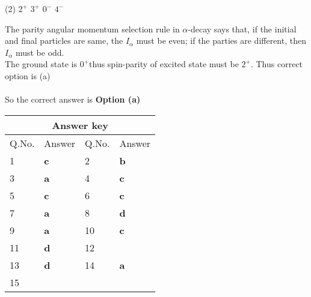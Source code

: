 \begin{enumerate}
	\begin{tasks}(2)
		\task[\textbf{a.}]$2^{+}$
		\task[\textbf{b.}]$3^{+}$
		\task[\textbf{c.}]$0^{-}$
		\task[\textbf{d.}]$4^{-}$ 
	\end{tasks}
	\begin{answer}
		The parity angular momentum selection rule in $\alpha$-decay says that, if the initial and final particles are same, the $I_\alpha$ must be even; if the parties are different, then $I_\alpha$ must be odd.\\	The ground state is $0^{+}$thus spin-parity of excited state must be $2^{+}$. Thus correct option is (a)\\\\
		So the correct answer is \textbf{Option (a)}
	\end{answer}
\end{enumerate}
\setlength\arrayrulewidth{1pt}
\begin{table}[H]
	\centering
	\begin{tabular}{|p{1.5cm}|p{1.5cm}||p{1.5cm}|p{1.5cm}|}
		\hline
		\multicolumn{4}{|c|}{\textbf{Answer key}}\\\hline\hline
		\rowcolor{ocrel}Q.No.&Answer&Q.No.&Answer\\\hline
		1&\textbf{c} &2&\textbf{b}\\\hline 
		3&\textbf{a} &4&\textbf{c} \\\hline
		5&\textbf{c} &6&\textbf{c} \\\hline
		7&\textbf{a}&8&\textbf{d}\\\hline
		9&\textbf{a}&10&\textbf{c}\\\hline
		11&\textbf{d} &12&\textbf{}\\\hline
		13&\textbf{d}&14&\textbf{a}\\\hline
		15&\textbf{}& &\\\hline
		
	\end{tabular}
\end{table}



